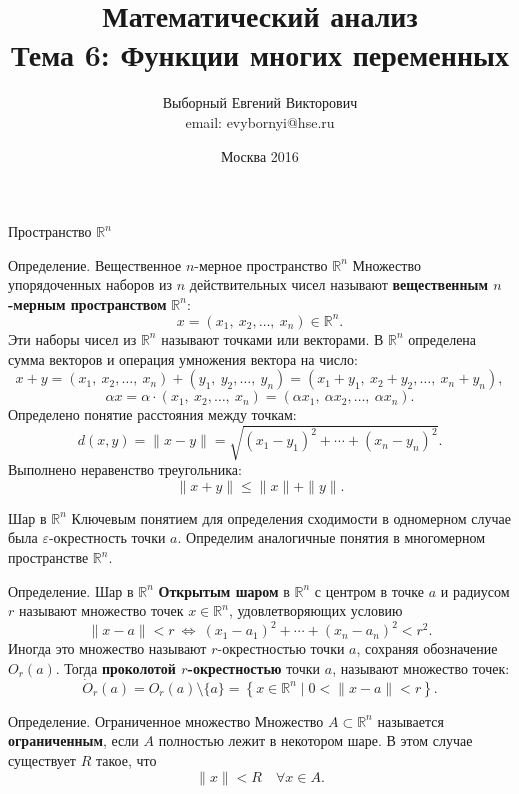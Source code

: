\documentclass[8pt]{beamer}
\title[Функции многих переменных]{Математический анализ\\ Тема 6: Функции многих переменных}
\author[Выборный Е. В.]{Выборный Евгений Викторович\\ email: evybornyi@hse.ru}
\date{Москва 2016}
\begin{document}

\begin{frame}
\titlepage
\end{frame}

\begin{frame}{Пространство $\mathbb{R}^n$}
\begin{block}{Определение. Вещественное $n$-мерное пространство $\mathbb{R}^n$}
Множество упорядоченных наборов из $n$ действительных чисел называют {\bf вещественным $n$-мерным пространством} $\mathbb{R}^n$:
$$x=(x_1,\ x_2,\ldots,\ x_n)\in \mathbb{R}^n.$$
Эти наборы чисел из $\mathbb{R}^n$ называют точками или векторами. В $\mathbb{R}^n$ определена сумма векторов и операция умножения вектора на число:
$$x+y = (x_1,\ x_2,\ldots,\ x_n)+(y_1,\ y_2,\ldots,\ y_n) = (x_1+y_1,\ x_2+y_2,\ldots,\ x_n+y_n),$$
$$\alpha x = \alpha\cdot (x_1,\ x_2,\ldots,\ x_n) = (\alpha x_1,\ \alpha x_2,\ldots,\ \alpha x_n).$$
Определено понятие расстояния между точкам:
$$d(x,y) = \|x-y\| = \sqrt{(x_1-y_1)^2+\cdots+(x_n-y_n)^2}.$$
Выполнено неравенство треугольника:
$$\|x+y\|\le \|x\|+\|y\|.$$
\end{block}
\end{frame}

\begin{frame}{Шар в $\mathbb{R}^n$}
Ключевым понятием для определения сходимости в одномерном случае была $\varepsilon$-окрестность точки $a$. Определим аналогичные понятия в многомерном пространстве $\mathbb{R}^n$.

\begin{block}{Определение. Шар в $\mathbb{R}^n$}
{\bf Открытым шаром} в $\mathbb{R}^n$ с центром в точке $a$ и радиусом $r$ называют множество точек $x\in \mathbb{R}^n$, удовлетворяющих условию
$$\|x-a\|< r\ \iff\ (x_1-a_1)^2+\cdots+(x_n-a_n)^2 < r^2.$$
Иногда это множество называют $r$-окрестностью точки $a$, сохраняя обозначение $O_r(a)$. Тогда {\bf проколотой $r$-окрестностью} точки $a$, называют множество точек:
$$\dot O_r(a) = O_r(a)\setminus \{a\} = 
\left\{ x\in\mathbb{R}^n\mid 0<\|x-a\|<r \right\}.
$$ 
\end{block}
\begin{block}{Определение. Ограниченное множество}
Множество $A\subset\mathbb{R}^n$ называется {\bf ограниченным}, если $A$ полностью лежит в некотором шаре. В этом случае существует $R$ такое, что
$$\|x\|<R\quad \forall x\in A.$$
\end{block}
\end{frame}
\end{document}
